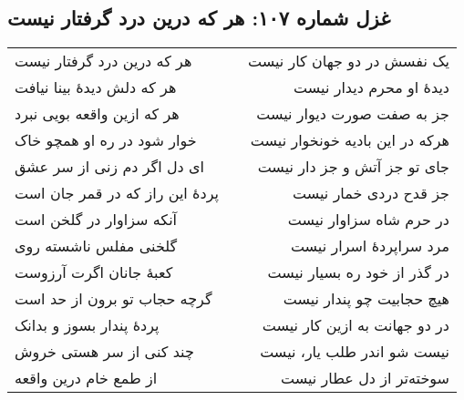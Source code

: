 \begin{center}
\section*{غزل شماره ۱۰۷: هر که درین درد گرفتار نیست}
\label{sec:107}
\begin{longtable}{l p{0.5cm} r}
هر که درین درد گرفتار نیست
&&
یک نفسش در دو جهان کار نیست
\\
هر که دلش دیدهٔ بینا نیافت
&&
دیدهٔ او محرم دیدار نیست
\\
هر که ازین واقعه بویی نبرد
&&
جز به صفت صورت دیوار نیست
\\
خوار شود در ره او همچو خاک
&&
هرکه در این بادیه خونخوار نیست
\\
ای دل اگر دم زنی از سر عشق
&&
جای تو جز آتش و جز دار نیست
\\
پردهٔ این راز که در قمر جان است
&&
جز قدح دردی خمار نیست
\\
آنکه سزاوار در گلخن است
&&
در حرم شاه سزاوار نیست
\\
گلخنی مفلس ناشسته روی
&&
مرد سراپردهٔ اسرار نیست
\\
کعبهٔ جانان اگرت آرزوست
&&
در گذر از خود ره بسیار نیست
\\
گرچه حجاب تو برون از حد است
&&
هیچ حجابیت چو پندار نیست
\\
پردهٔ پندار بسوز و بدانک
&&
در دو جهانت به ازین کار نیست
\\
چند کنی از سر هستی خروش
&&
نیست شو اندر طلب یار، نیست
\\
از طمع خام درین واقعه
&&
سوخته‌تر از دل عطار نیست
\\
\end{longtable}
\end{center}
